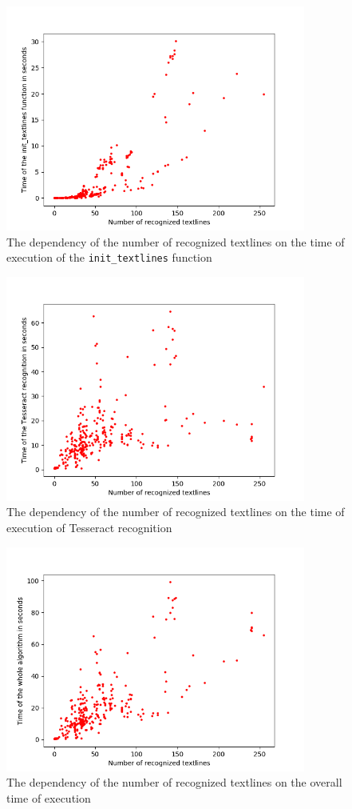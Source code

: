 \begin{figure}
\centering
\includegraphics[height=20em]{img/results/textlinesTimeInit.png}
\caption{The dependency of the number of recognized textlines on the time of execution of the \texttt{init\_textlines} function}
\label{fig:textlinesTimeInit}
\end{figure}

\begin{figure}
\centering
\includegraphics[height=20em]{img/results/textlinesTimeTesseract.png}
\caption{The dependency of the number of recognized textlines on the time of execution of Tesseract recognition}
\label{fig:textlinesTimeTess}
\end{figure}

\begin{figure}
\centering
\includegraphics[height=20em]{img/results/textlinesTimeAll.png}
\caption{The dependency of the number of recognized textlines on the overall time of execution}
\label{fig:textlinesTime}
\end{figure}

